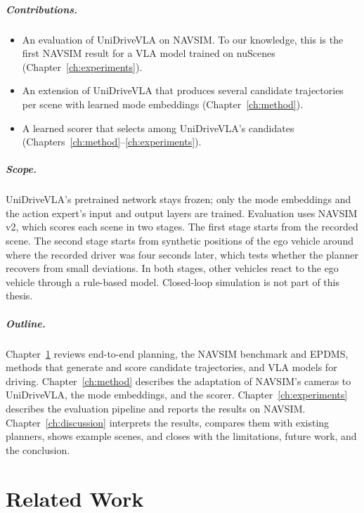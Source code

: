 \documentclass[11pt, a4paper, oneside]{book}
\begin{document}
\paragraph{Contributions.}
\begin{itemize}
  \item An evaluation of UniDriveVLA on NAVSIM. To our knowledge, this is the first NAVSIM
  result for a VLA model trained on nuScenes (Chapter~\ref{ch:experiments}).
  \item An extension of UniDriveVLA that produces several candidate trajectories per scene
  with learned mode embeddings (Chapter~\ref{ch:method}).
  \item A learned scorer that selects among UniDriveVLA's candidates
  (Chapters~\ref{ch:method}--\ref{ch:experiments}).
\end{itemize}

\paragraph{Scope.}
UniDriveVLA's pretrained network stays frozen; only the mode embeddings and the action
expert's input and output layers are trained. Evaluation uses NAVSIM v2, which scores each scene in two stages. The first stage starts from
the recorded scene. The second stage starts from synthetic positions of the ego vehicle
around where the recorded driver was four seconds later, which tests whether the planner
recovers from small deviations. In
both stages, other vehicles react to the ego vehicle through a rule-based model. Closed-loop
simulation is not part of this thesis.

\paragraph{Outline.}
Chapter~\ref{ch:related} reviews end-to-end planning, the NAVSIM benchmark and EPDMS, methods
that generate and score candidate trajectories, and VLA models for driving.
Chapter~\ref{ch:method} describes the adaptation of NAVSIM's cameras to UniDriveVLA, the mode
embeddings, and the scorer. Chapter~\ref{ch:experiments} describes the evaluation pipeline and
reports the results on NAVSIM. Chapter~\ref{ch:discussion} interprets the results, compares
them with existing planners, shows example scenes, and closes with the limitations, future
work, and the conclusion.

\chapter{Related Work}
\label{ch:related}
\end{document}
